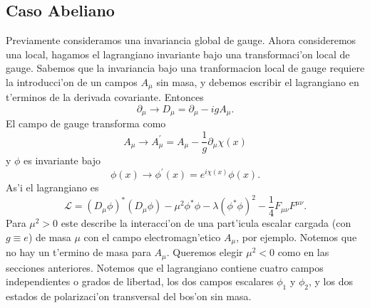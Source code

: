\subsection{Caso Abeliano}
Previamente consideramos una invariancia global de gauge. Ahora consideremos una local, hagamos el lagrangiano invariante bajo una transformaci'on local de gauge. Sabemos que la invariancia bajo una tranformacion local de gauge requiere la introducci'on de un campos $A_{\mu}$
  sin masa, y debemos escribir el lagrangiano en t'erminos de la derivada covariante. Entonces
\begin{equation}
\partial_{\mu}\rightarrow D_{\mu}=\partial_{\mu}-igA_{\mu}.
\end{equation}
El campo de gauge transforma como
\begin{equation}
A_{\mu}\rightarrow A_{\mu}^{\prime}=A_{\mu}-\frac{1}{g}\partial_{\mu}\chi(x)
\end{equation}
y $\phi$ es invariante bajo
\begin{equation}\label{ecuacion8.17}
\phi(x)\rightarrow\phi^{\prime}(x)=e^{i\chi(x)}\phi(x).
\end{equation}
As'i el lagrangiano es
\begin{equation}\label{ecuacion8.18}
\mathcal{L}=(D_{\mu}\phi)^{*}(D_{\mu}\phi)-\mu^{2}\phi^{*}\phi-\lambda(\phi^{*}\phi)^{2}-\frac{1}{4}F_{\mu\nu}F^{\mu\nu}.
\end{equation}
Para $\mu^{2}>0$
  este describe la interacci'on de una part'icula escalar cargada (con $g\equiv e$)
  de masa $\mu$
  con el campo electromagn'etico $A_{\mu}$,
  por ejemplo. Notemos que no hay un t'ermino de masa para $A_{\mu}$.
  Queremos elegir $\mu^{2}<0$
  como en las secciones anteriores. Notemos que el lagrangiano contiene cuatro campos independientes o grados de libertad, los dos campos escalares $\phi_{1}$
  y $\phi_{2}$, y los dos estados de polarizaci'on transversal del bos'on sin masa. 

